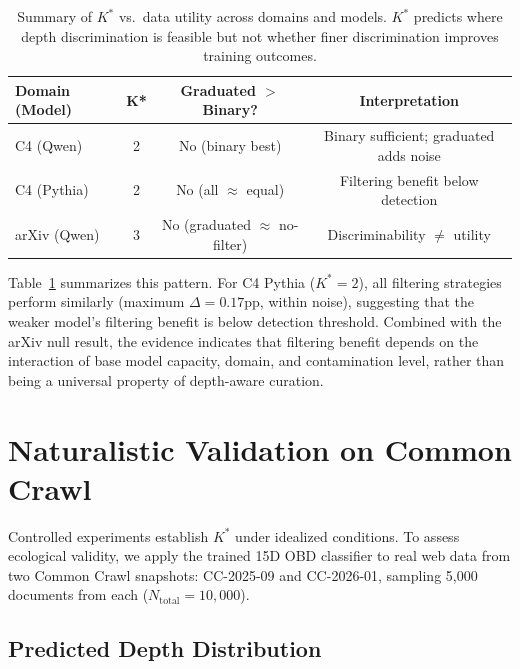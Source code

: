 \documentclass[11pt,a4paper]{article}
\begin{document}
\begin{table}[t]
\centering
\caption{Summary of $K^*$ vs.\ data utility across domains and models. $K^*$ predicts where depth discrimination is feasible but not whether finer discrimination improves training outcomes.}
\label{tab:kstar_vs_utility}
\small
\begin{tabular}{lccc}
\toprule
\textbf{Domain (Model)} & \textbf{K*} & \textbf{Graduated $>$ Binary?} & \textbf{Interpretation} \\
\midrule
C4 (Qwen) & 2 & No (binary best) & Binary sufficient; graduated adds noise \\
C4 (Pythia) & 2 & No (all $\approx$ equal) & Filtering benefit below detection \\
arXiv (Qwen) & 3 & No (graduated $\approx$ no-filter) & Discriminability $\neq$ utility \\
\bottomrule
\end{tabular}
\end{table}

Table~\ref{tab:kstar_vs_utility} summarizes this pattern. For C4 Pythia ($K^*{=}2$), all filtering strategies perform similarly (maximum $\Delta = 0.17$pp, within noise), suggesting that the weaker model's filtering benefit is below detection threshold. Combined with the arXiv null result, the evidence indicates that filtering benefit depends on the interaction of base model capacity, domain, and contamination level, rather than being a universal property of depth-aware curation.


\section{Naturalistic Validation on Common Crawl}
\label{sec:naturalistic}

Controlled experiments establish $K^*$ under idealized conditions. To assess ecological validity, we apply the trained 15D OBD classifier to real web data from two Common Crawl snapshots: CC-2025-09 and CC-2026-01, sampling 5,000 documents from each ($N_{\text{total}} = 10{,}000$).

\subsection{Predicted Depth Distribution}
\end{document}
